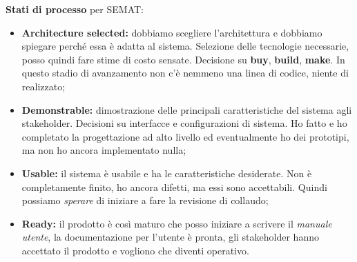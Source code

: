 \textbf{Stati di processo} per SEMAT:

\begin{itemize}

	\item \textbf{Architecture selected:} dobbiamo scegliere l'architettura e dobbiamo spiegare perché essa è adatta al sistema. Selezione delle tecnologie necessarie, posso quindi fare stime di costo sensate. Decisione su \textbf{buy}, \textbf{build}, \textbf{make}. In questo stadio di avanzamento non c'è nemmeno una linea di codice, niente di realizzato;
	\item \textbf{Demonstrable:} dimostrazione delle principali caratteristiche del sistema agli stakeholder. Decisioni su interfacce e configurazioni di sistema. Ho fatto e ho completato la progettazione ad alto livello ed eventualmente ho dei prototipi, ma non ho ancora implementato nulla;
	\item \textbf{Usable:} il sistema è usabile e ha le caratteristiche desiderate. Non è completamente finito, ho ancora difetti, ma essi sono accettabili. Quindi possiamo \textit{sperare} di iniziare a fare la revisione di collaudo;
	\item \textbf{Ready:} il prodotto è così maturo che posso iniziare a scrivere il \textit{manuale utente}, la documentazione per l'utente è pronta, gli stakeholder hanno accettato il prodotto e vogliono che diventi operativo.
\end{itemize}

